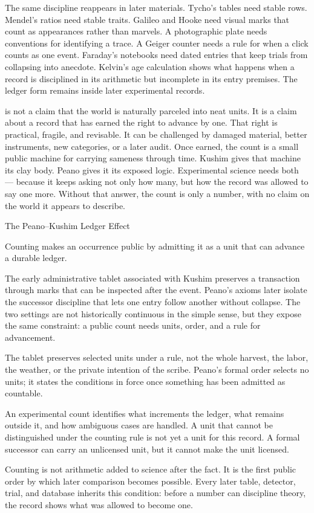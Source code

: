 The same discipline reappears in later materials. Tycho's tables need
stable rows. Mendel's ratios need stable traits. Galileo and Hooke need
visual marks that count as appearances rather than marvels. A photographic
plate needs conventions for identifying a trace. A Geiger counter needs a
rule for when a click counts as one event. Faraday's notebooks need dated
entries that keep trials from collapsing into anecdote. Kelvin's age
calculation shows what happens when a record is disciplined in its
arithmetic but incomplete in its entry premises. The ledger form remains
inside later experimental records.

 is not a claim that the world is naturally parceled into
neat units. It is a claim about a record that has earned the right to
advance by one. That right is practical, fragile, and revisable. It can be
challenged by damaged material, better instruments, new categories, or a
later audit. Once earned, the count is a small public machine for carrying
sameness through time. Kushim gives that machine its clay body. Peano gives
it its exposed logic. Experimental science needs both --- because it keeps
asking not only how many, but how the record was allowed to say one more.
Without that answer, the count is only a number, with no claim on the world
it appears to describe.

\begin{phenom}{The Peano--Kushim Ledger Effect~\cite{peano1889,schmandtbesserat1992}}
\label{ph:peano-kushim-ledger}

\PhStatement
Counting makes an occurrence public by admitting it as a unit that can advance
a durable ledger.

\PhOrigin
The early administrative tablet associated with Kushim preserves a transaction
through marks that can be inspected after the event. Peano's axioms later
isolate the successor discipline that lets one entry follow another without
collapse. The two settings are not historically continuous in the simple
sense, but they expose the same constraint: a public count needs units, order,
and a rule for advancement.

\PhObservation
The tablet preserves selected units under a rule, not the whole harvest, the
labor, the weather, or the private intention of the scribe. Peano's formal
order selects no units; it states the conditions in force once something has
been admitted as countable.

\PhConstraint
An experimental count identifies what increments the ledger, what remains
outside it, and how ambiguous cases are handled. A unit that cannot be
distinguished under the counting rule is not yet a unit for this record. A
formal successor can carry an unlicensed unit, but it cannot make the unit
licensed.

\PhConsequence
Counting is not arithmetic added to science after the fact. It is the first
public order by which later comparison becomes possible. Every later table,
detector, trial, and database inherits this condition: before a number can
discipline theory, the record shows what was allowed to become one.
\end{phenom}

